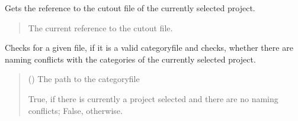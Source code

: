 \documentclass[letterpaper,10pt,english]{sphinxmanual}
\begin{document}
\begin{fulllineitems}
\begin{fulllineitems}
\label{\detokenize{apidoc/src.osm_configurator.control:src.osm_configurator.control.control_interface.IControl.get_cut_out_reference}}
\pysigstartsignatures
{}
\pysigstopsignatures
\sphinxAtStartPar
Gets the reference to the cut\sphinxhyphen{}out file of the currently selected project.
\begin{quote}\begin{description}
\sphinxAtStartPar
The current reference to the cut\sphinxhyphen{}out file.

\sphinxAtStartPar
{}

\end{description}\end{quote}

\end{fulllineitems}


\begin{fulllineitems}
\label{\detokenize{apidoc/src.osm_configurator.control:src.osm_configurator.control.control_interface.IControl.check_conflicts_in_category_configuration}}
\pysigstartsignatures
{}
\pysigstopsignatures
\sphinxAtStartPar
Checks for a given file, if it is a valid category\sphinxhyphen{}file and checks, whether there are naming conflicts with the categories of the currently selected project.
\begin{quote}\begin{description}
\sphinxAtStartPar
{} () \textendash{} The path to the category\sphinxhyphen{}file

\sphinxAtStartPar
True, if there is currently a project selected and there are no naming conflicts; False, otherwise.


\end{description}
\end{quote}
\end{fulllineitems}
\end{fulllineitems}
\end{document}
